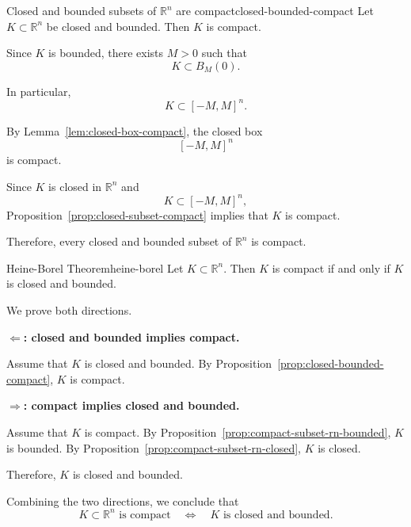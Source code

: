 \documentclass[UTF8,12pt,a4paper]{ctexart}
\makeatletter
\numberwithin{equation}{section}
\newcommand{\currentProofColor}{black}
\renewenvironment{proof}[1][Proof]{%
  \par
  \begingroup
  \edef\proofQEDColor{\currentProofColor}%
  \renewcommand{\qedsymbol}{\textcolor{\proofQEDColor}{$\blacksquare$}}%
  \pushQED{\qed}%
  \normalfont
  \topsep6\p@\@plus6\p@\relax
  \trivlist
  \item[\hskip\labelsep\bfseries\itshape #1\@addpunct{.}]\ignorespaces
}{%
  \popQED
  \endtrivlist
  \@endpefalse
  \endgroup
}
\makeatother
\begin{document}
\begin{prop}{Closed and bounded subsets of $\mathbb{R}^n$ are compact}{closed-bounded-compact}
Let $K\subset\mathbb{R}^n$ be closed and bounded. Then $K$ is compact.
\end{prop}

\begin{proof}
Since $K$ is bounded, there exists $M>0$ such that
$$
K\subset B_M(0).
$$

In particular,
$$
K\subset [-M,M]^n.
$$

By Lemma~\ref{lem:closed-box-compact}, the closed box
$$
[-M,M]^n
$$
is compact.

Since $K$ is closed in $\mathbb{R}^n$ and
$$
K\subset [-M,M]^n,
$$
Proposition~\ref{prop:closed-subset-compact} implies that $K$ is compact.

Therefore, every closed and bounded subset of $\mathbb{R}^n$ is compact.
\end{proof}

\begin{thm}{Heine-Borel Theorem}{heine-borel}
Let $K\subset\mathbb{R}^n$. Then $K$ is compact if and only if $K$ is closed and bounded.
\end{thm}

\begin{proof}
We prove both directions.

\medskip

\noindent \textbf{$\Longleftarrow$: closed and bounded implies compact.}

Assume that $K$ is closed and bounded. By Proposition~\ref{prop:closed-bounded-compact}, $K$ is compact.

\medskip

\noindent \textbf{$\Longrightarrow$: compact implies closed and bounded.}

Assume that $K$ is compact. By Proposition~\ref{prop:compact-subset-rn-bounded}, $K$ is bounded. By Proposition~\ref{prop:compact-subset-rn-closed}, $K$ is closed.

Therefore, $K$ is closed and bounded.

Combining the two directions, we conclude that
$$
K\subset\mathbb{R}^n \text{ is compact}
\quad\Longleftrightarrow\quad
K \text{ is closed and bounded}.
$$
\end{proof}
\end{document}
